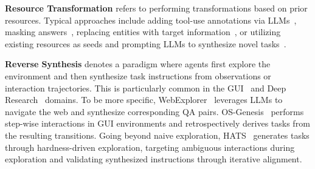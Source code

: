\textbf{Resource Transformation} refers to performing transformations based on prior resources. Typical approaches include adding tool-use annotations via LLMs~\cite{Toolformer, ToolCoder, ToolBench}, masking answers~\cite{MaskSearch}, replacing entities with target information~\cite{VSearcher, WebWatcher}, or utilizing existing resources as seeds and prompting LLMs to synthesize novel tasks~\cite{Self-Improvement, Lingma_SWE-GPT}.


\textbf{Reverse Synthesis} denotes a paradigm where agents first explore the environment and then synthesize task instructions from observations or interaction trajectories. This is particularly common in the GUI~\cite{OS-Genesis, AutoPlay, HATS} and Deep Research~\cite{BAGEL, Explorer, Insta, Cognitive_Kernel_Pro, WebExplorer, WebAggregator, SynthAgent, AgentEvolver} domains. To be more specific, WebExplorer~\cite{WebExplorer} leverages LLMs to navigate the web and synthesize corresponding QA pairs. OS-Genesis~\cite{OS-Genesis} performs step-wise interactions in GUI environments and retrospectively derives tasks from the resulting transitions. Going beyond naive exploration, HATS~\cite{HATS} generates tasks through hardness-driven exploration, targeting ambiguous interactions during exploration and validating synthesized instructions through iterative alignment.

